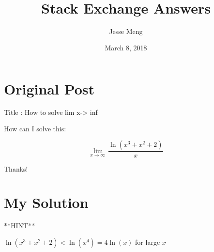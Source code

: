 \documentclass{article}
\title{Stack Exchange Answers}
\author{Jesse Meng }
\date{March 8, 2018}
\begin{document}
\maketitle

\section{Original Post}
Title : How to solve lim x-> inf

How can I solve this:

$$\lim\limits _{x\to \infty \:}\frac {\ln (x^3+x^2+2)}x$$

Thanks! 
\section{My Solution}
**HINT**

 $\ln(x^3+x^2+2) <\ln(x^4)=4\ln(x)$ for large $x$
\end{document}
